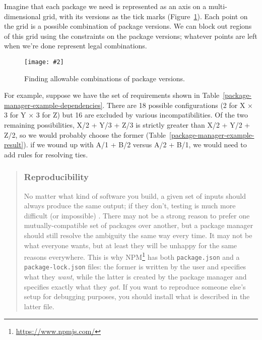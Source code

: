 \documentclass[krantzl]{krantz}
\newcommand{\figpdf}[4]{\begin{figure}%
\centering%
\texttt{[image: \#2]}%
\caption{#3}%
\label{#1}%
\end{figure}}
\newcommand{\figref}[1]{Figure~\ref{#1}}
\newcommand{\tblref}[1]{Table~\ref{#1}}
\newenvironment{callout}{\savenotes\begin{tBox}\begin{quotation}\toggletrue{inbox}\renewcommand{\thempfootnote}{\arabic{footnote}}}{\end{quotation}\vspace{\baselineskip}\end{tBox}\togglefalse{inbox}\spewnotes}
\newcommand{\hreffoot}[2]{{#1}\footnote{\href{#2}{#2}}}
\begin{document}
Imagine that each package we need is represented as an axis on a multi-dimensional grid,
with its versions as the tick marks
(\figref{package-manager-allowable}).
Each point on the grid is a possible combination of package versions.
We can block out regions of this grid using the constraints on the package versions;
whatever points are left when we're done represent legal combinations.

\figpdf{package-manager-allowable}{./package-manager/allowable.pdf}{Finding allowable combinations of package versions.}{0.6}


For example,
suppose we have the set of requirements shown in \tblref{package-manager-example-dependencies}.
There are 18 possible configurations
(2 for X × 3 for Y × 3 for Z)
but 16 are excluded by various incompatibilities.
Of the two remaining possibilities,
X/2 + Y/3 + Z/3 is strictly greater than X/2 + Y/2 + Z/2,
so we would probably choose the former
(\tblref{package-manager-example-result}).
if we wound up with A/1 + B/2 versus A/2 + B/1,
we would need to add rules for resolving ties.

\begin{callout}


\subsubsection*{Reproducibility}


No matter what kind of software you build,
a given set of inputs should always produce the same output;
if they don't,
testing is much more difficult (or impossible) \cite{Taschuk2017}.
There may not be a strong reason to prefer one mutually-compatible set of packages over another,
but a package manager should still resolve the ambiguity the same way every time.
It may not be what everyone wants,
but at least they will be unhappy for the same reasons everywhere.
This is why \hreffoot{NPM}{https://www.npmjs.com/} has both \texttt{package.json} and a \texttt{package-lock.json} files:
the former is written by the user and specifies what they \emph{want},
while the latter is created by the package manager and specifies exactly what they \emph{got}.
If you want to reproduce someone else's setup for debugging purposes,
you should install what is described in the latter file.

\end{callout}
\end{document}
